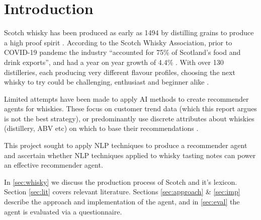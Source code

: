 \section{Introduction}\label{sec:intro}
Scotch whisky has been produced as early as 1494 by distilling grains to produce
a high proof spirit \cite{Jacques2003, Pyke1965}.
According to the Scotch Whisky Association, prior to COVID-19 pandemc the industry 
``accounted for 75\% of Scotland's food and drink exports'', and had a year on year growth of 4.4\% 
\cite{swa2, swa}.
With over 130 distilleries, each producing very different flavour profiles, choosing the next whisky to try 
could be challenging, enthusiast and beginner alike \cite{n_distilleries, powell_2021}.

Limited attempts have been made to apply AI methods to create recommender agents for whiskies.
These focus on customer trend data (which this report argues is not the best strategy), or predominantly
use discrete attributes about whiskies (distillery, ABV etc) on which to base their recommendations
\cite{Omidzohoor, Coldevin2005}.

This project sought to apply NLP techniques to produce a recommender agent and ascertain whether
NLP techniques applied to whisky tasting notes can power an effective recommender agent.  

In \autoref{sec:whisky} we discuss the production process of Scotch and it's lexicon. Section 
\ref{sec:lit} covers relevant literature. Sections 
\ref{sec:approach} \& \ref{sec:imp} describe the approach and implementation of the agent, and in 
\autoref{sec:eval} the agent is evaluated via a questionnaire.